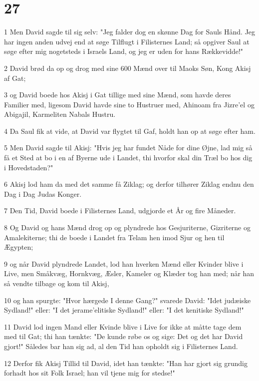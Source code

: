 \chapter{27}

\par 1 Men David sagde til sig selv: "Jeg falder dog en skønne Dag for Sauls Hånd. Jeg har ingen anden udvej end at søge Tilflugt i Filisternes Land; så opgiver Saul at søge efter mig nogetsteds i Israels Land, og jeg er uden for hans Rækkevidde!"
\par 2 David brød da op og drog med sine 600 Mænd over til Maoks Søn, Kong Akisj af Gat;
\par 3 og David boede hos Akisj i Gat tillige med sine Mænd, som havde deres Familier med, ligesom David havde sine to Hustruer med, Ahinoam fra Jizre'el og Abigajil, Karmeliten Nabals Hustru.
\par 4 Da Saul fik at vide, at David var flygtet til Gaf, holdt han op at søge efter ham.
\par 5 Men David sagde til Akisj: "Hvis jeg har fundet Nåde for dine Øjne, lad mig så få et Sted at bo i en af Byerne ude i Landet, thi hvorfor skal din Træl bo hos dig i Hovedstaden?"
\par 6 Akisj lod ham da med det samme få Ziklag; og derfor tilhører Ziklag endnu den Dag i Dag Judas Konger.
\par 7 Den Tid, David boede i Filisternes Land, udgjorde et År og fire Måneder.
\par 8 Og David og hans Mænd drog op og plyndrede hos Gesjuriterne, Gizriterne og Amalekiterne; thi de boede i Landet fra Telam hen imod Sjur og hen til Ægypten;
\par 9 og når David plyndrede Landet, lod han hverken Mænd eller Kvinder blive i Live, men Småkvæg, Hornkvæg, Æsler, Kameler og Klæder tog han med; når han så vendte tilbage og kom til Akisj,
\par 10 og han spurgte: "Hvor hærgede I denne Gang?" svarede David: "Idet judæiske Sydland!" eller: "I det jerame'elitiske Sydland!" eller: "I det kenitiske Sydland!"
\par 11 David lod ingen Mand eller Kvinde blive i Live for ikke at måtte tage dem med til Gat; thi han tænkte: "De kunde røbe os og sige: Det og det har David gjort!" Således bar han sig ad, al den Tid han opholdt sig i Filisternes Land.
\par 12 Derfor fik Akisj Tillid til David, idet han tænkte: "Han har gjort sig grundig forhadt hos sit Folk Israel; han vil tjene mig for stedse!"

